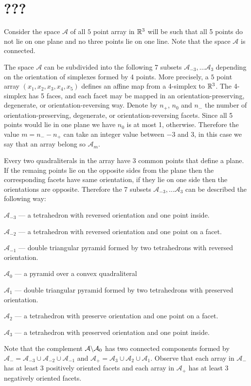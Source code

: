 \documentclass{article}
\begin{document}
\section{???}

Consider the space $\mathcal{A}$ of all $5$ point array in $\mathbb{R}^3$ will be such that all 5 points do not lie on one plane and no three points lie on one line.
Note that the space $\mathcal{A}$ is connected.

The space $\mathcal{A}$ can be subdivided into the following 7 subsets $\mathcal{A}_{-3},\dots \mathcal{A}_{3}$
depending on the orientation of simplexes formed by 4 points.
More precisely, a $5$ point array  $(x_1,x_2,x_3,x_4,x_5)$ defines an affine map from a 4-simplex to $\mathbb{R}^3$.
The 4-simplex has 5 faces, and each facet may be mapped in an orientation-preserving, degenerate, or orientation-reversing way.
Denote by $n_+$, $n_0$ and $n_-$ the number of orientation-preserving, degenerate, or orientation-reversing facets.
Since all 5 points would lie in one plane we have $n_0$ is at most 1, otherwise.
Therefore the value $m=n_--n_+$ can take an integer value between $-3$ and $3$, in this case we say that an array belong so $\mathcal{A}_m$.

Every two quadraliterals in the array have 3 common points that define a plane.
If the remaing points lie on the opposite sides from the plane then the corresponding facets have same orientation, if they lie on one side then the orientations are opposite.
Therefore the 7 subsets $\mathcal{A}_{-3},\dots \mathcal{A}_{3}$ can be described the following way:


$\mathcal{A}_{-3}$ --- a tetrahedron with reversed orientation and one point inside.

$\mathcal{A}_{-2}$ --- a tetrahedron with reversed orientation and one point on a facet.

$\mathcal{A}_{-1}$ --- double triangular pyramid formed by two tetrahedrons with reversed orientation.

$\mathcal{A}_{0}$ --- a pyramid over a convex quadraliteral 

$\mathcal{A}_{1}$ --- double triangular pyramid formed by two tetrahedrons with preserved orientation.

$\mathcal{A}_{2}$ --- a tetrahedron with preserve orientation and one point on a facet.

$\mathcal{A}_{3}$ --- a tetrahedron with preserved orientation and one point inside.

Note that the complement $\mathcal{A}\backslash \mathcal{A}_0$ has two connected components formed by $\mathcal{A}_{-}=\mathcal{A}_{-3}\cup \mathcal{A}_{-2}\cup\mathcal{A}_{-1}$ and $\mathcal{A}_{+}=\mathcal{A}_{3}\cup \mathcal{A}_{2}\cup\mathcal{A}_{1}$.
Observe that each array in $\mathcal{A}_{-}$ has at least 3 positively oriented facets and each array in $\mathcal{A}_{+}$ has at least 3 negatively oriented facets.
\end{document}
